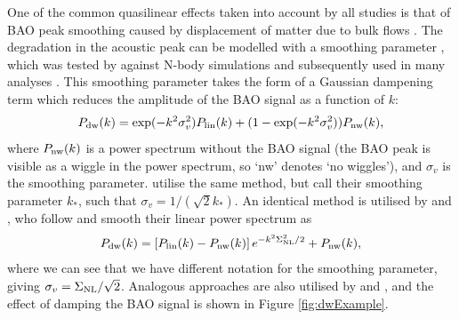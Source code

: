\documentclass[titlesmallcaps, examinerscopy, copyrightpage]{uqthesis}
\begin{document}
One of the common quasilinear effects taken into account by all studies is that of BAO peak smoothing caused by displacement of matter due to bulk flows \citep{EisensteinSeoWhite2007,CrocceScoccimarro2008,Matsubara2008,CrocceScoccimarro2006}. The degradation in the acoustic peak can be modelled with a smoothing parameter \citep{CrocceScoccimarro2008}, which was tested by \citet{SanchezBaughAngulo2008} against N-body simulations and subsequently used in many analyses \citep{BlakeDavis2011,EisensteinZehavi2005,Sanchez2009,BeutlerBlake2011}. This smoothing parameter takes the form of a Gaussian dampening term which reduces the amplitude of the BAO signal as a function of $k$:
\begin{align} \label{{eq:blake1}}
P_{\rm{dw}}(k) = \exp(-k^2 \sigma_v^2) P_{\rm{lin}}(k) + (1 - \exp(-k^2 \sigma_v^2)) P_{\rm{nw}}(k),
\end{align}
where $P_{\rm{nw}}(k)$ is a power spectrum without the BAO signal (the BAO peak is visible as a wiggle in the power spectrum, so `nw' denotes `no wiggles'), and $\sigma_v$ is the smoothing parameter. \citet{ChuangWang2012} utilise the same method, but call their smoothing parameter $k_*$, such that $\sigma_v = 1/(\sqrt{2} k_*)$. An identical method is utilised by \citep{AndersonAubourg2012} and \citet{XuPadmanabhan2012}, who follow \citet{EisensteinSeoWhite2007} and smooth their linear power spectrum as
\begin{align}
P_{\rm{dw}}(k) = \left[ P_{\rm{lin}}(k) - P_{\rm{nw}}(k) \right] e^{-k^2 \Sigma_{\rm{NL}}^2 / 2} + P_{\rm{nw}}(k),
\end{align}
where we can see that we have different notation for the smoothing parameter, giving $\sigma_v = \Sigma_{\rm{NL}} / \sqrt{2}$. Analogous approaches are also utilised by \citet{MontesanoSanchezPhelps2012} and \citet{SanchezScoccola2012}, and the effect of damping the BAO signal is shown in Figure \ref{fig:dwExample}.
\end{document}

